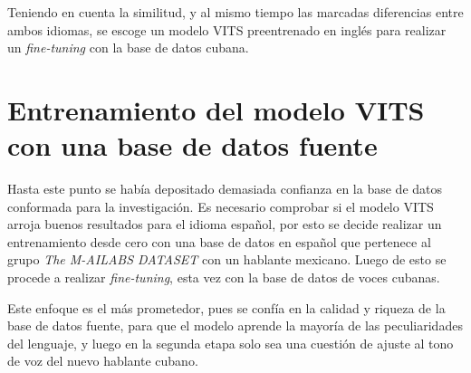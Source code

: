 Teniendo en cuenta la similitud, y al mismo tiempo las marcadas diferencias entre ambos idiomas, se escoge un modelo VITS preentrenado en inglés para realizar un \textit{fine-tuning} con la base de datos cubana.


\section{Entrenamiento del modelo VITS con una base de datos fuente} \label{angelina}

Hasta este punto se había depositado demasiada confianza en la base de datos conformada para la investigación. Es necesario comprobar si el modelo VITS arroja buenos resultados para el idioma español, por esto se decide realizar un entrenamiento desde cero con una base de datos en español que pertenece al grupo \textit{The M-AILABS DATASET} con un hablante mexicano. Luego de esto se procede a realizar \textit{fine-tuning}, esta vez con la base de datos de voces cubanas. 

Este enfoque es el más prometedor, pues se confía en la calidad y riqueza de la base de datos fuente, para que el modelo aprende la mayoría de las peculiaridades del lenguaje, y luego en la segunda etapa solo sea una cuestión de ajuste al tono de voz del nuevo hablante cubano.
